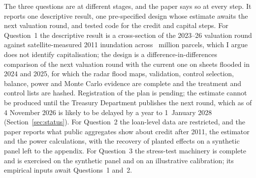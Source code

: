 The three questions are at different stages, and the paper says so at every step. It reports one descriptive result, one pre-specified design whose estimate awaits the next valuation round, and tested code for the credit and capital steps. For Question~1 the descriptive result is a cross-section of the 2023--26 valuation round against satellite-measured 2011 inundation across \pilotParcelsM~million parcels, which I argue does not identify capitalisation; the design is a difference-in-differences comparison of the next valuation round with the current one on sheets flooded in 2024 and 2025, for which the radar flood maps, validation, control selection, balance, power and Monte Carlo evidence are complete and the treatment and control lists are hashed. Registration of the plan is pending; the estimate cannot be produced until the Treasury Department publishes the next round, which as of 4 November 2026 is likely to be delayed by a year to 1~January 2028 (Section~\ref{sec:status}). For Question~2 the loan-level data are restricted, and the paper reports what public aggregates show about credit after 2011, the estimator and the power calculations, with the recovery of planted effects on a synthetic panel left to the appendix. For Question~3 the stress-test machinery is complete and is exercised on the synthetic panel and on an illustrative calibration; its empirical inputs await Questions~1 and~2.

